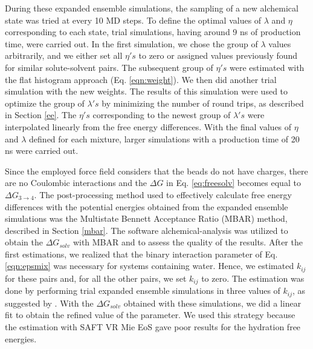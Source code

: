 During these expanded ensemble simulations, the sampling of a new alchemical state was tried at every 10 MD steps. To define the optimal values of $\lambda$ and $\eta$ corresponding to each state, trial simulations, having around 9 ns of production time, were carried out. In the first simulation, we chose the group of $\lambda$ values arbitrarily, and we either set all $\eta 's$ to zero or assigned values previously found for similar solute-solvent pairs. The subsequent group of $\eta 's$ were estimated with the flat histogram approach (Eq. \eqref{eqn:weight}). We then did another trial simulation with the new weights. The results of this simulation were used to optimize the group of $\lambda 's$ by minimizing the number of round trips, as described in Section \ref{ee}. The $\eta 's$ corresponding to the newest group of $\lambda 's$ were interpolated linearly from the free energy differences. With the final values of $\eta$ and $\lambda $ defined for each mixture, larger simulations with a production time of 20 ns were carried out. 

Since the employed force field considers that the beads do not have charges, there are no Coulombic interactions and the $\Delta G$ in Eq. \eqref{eq:freesolv} becomes equal to $\Delta G_{3 \rightarrow 4} $. The post-processing method used to effectively calculate free energy differences with the potential energies obtained from the expanded ensemble simulations was the Multistate Bennett Acceptance Ratio (MBAR) method, described in Section \ref{mbar}. The software alchemical-analysis \cite{klimovich} was utilized to obtain the $\Delta G_{solv}$ with MBAR and to assess the quality of the results. After the first estimations, we realized that the binary interaction parameter of Eq. \eqref{eqn:epsmix} was necessary for systems containing water. Hence, we estimated  $k_{ij}$ for these pairs and, for all the other pairs, we set  $k_{ij}$ to zero. The estimation was done by performing trial expanded ensemble simulations in three values of $k_{ij}$, as suggested by . With the $\Delta G_{solv}$ obtained with these simulations, we did a linear fit to obtain the refined value of the parameter. We used this strategy because the estimation with SAFT VR Mie EoS gave poor results for the hydration free energies.

